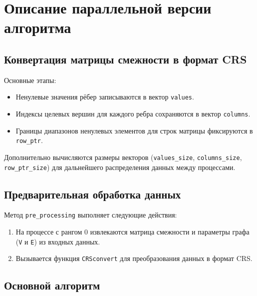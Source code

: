 \documentclass[a4paper,14pt]{extarticle}
\begin{document}
\section*{Описание параллельной версии алгоритма}

\subsection*{Конвертация матрицы смежности в формат CRS}

 Основные этапы:
\begin{itemize}
    \item Ненулевые значения рёбер записываются в вектор \texttt{values}.
    \item Индексы целевых вершин для каждого ребра сохраняются в вектор \texttt{columns}.
    \item Границы диапазонов ненулевых элементов для строк матрицы фиксируются в \texttt{row\_ptr}.
\end{itemize}
Дополнительно вычисляются размеры векторов (\texttt{values\_size}, \texttt{columns\_size}, \texttt{row\_ptr\_size}) для дальнейшего распределения данных между процессами.

\subsection*{Предварительная обработка данных}

Метод \texttt{pre\_processing} выполняет следующие действия:
\begin{enumerate}
    \item На процессе с рангом 0 извлекаются матрица смежности и параметры графа (\texttt{V} и \texttt{E}) из входных данных.
    \item Вызывается функция \texttt{CRSconvert} для преобразования данных в формат CRS.
\end{enumerate}

\subsection*{Основной алгоритм}
\end{document}

